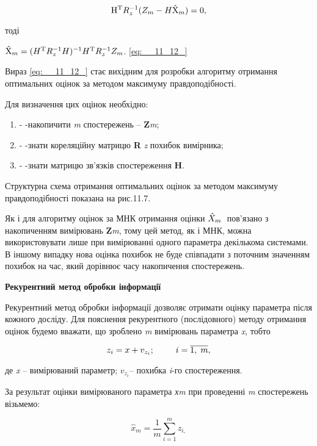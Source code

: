 \[{\rm H} ^{{\rm T}} R_{z}^{-1} (Z_{m} -H\hat{{\rm X} }_{m} )=0,\] 

тоді        

   $\hat{{\rm X} }_{m} =(H^{{\rm T}} R_{z}^{-1} H)^{-1} H^{{\rm T}} R_{z}^{-1} Z_{m} $.                      
\eqref{eq:__11_12_}

Вираз \eqref{eq:__11_12_} стає вихідним для розробки алгоритму отримання оптимальних 
оцінок  за методом максимуму правдоподібності.

Для визначення цих оцінок необхідно:

\begin{enumerate}
\item - -накопичити \textit{m}  спостережень -- \textbf{Z}\textit{m};

\item - -знати кореляційну матрицю \textbf{R }\textit{z} похибок вимірника;

\item - -знати матрицю зв'язків спостереження \textbf{H}.
\end{enumerate}

Структурна схема отримання оптимальних оцінок за методом максимуму правдоподібності 
показана на рис.11.7.

Як і для алгоритму оцінок за МНК отримання оцінки $\hat{X}_{m{\rm \; }} $  пов'язано 
з накопиченням вимірювань \textbf{Z}\textit{m}, тому цей метод, як і МНК, можна використовувати 
лише при вимірюванні одного параметра декількома системами. В іншому випадку нова 
оцінка похибок  не буде співпадати з поточним значенням похибок на час, який дорівнює 
часу накопичення спостережень.

$ $\textbf{Рекурентний метод обробки інформації}

 Рекурентний метод обробки інформації\textbf{ }дозволяє отримати оцінку параметра 
після кожного досліду. Для пояснення рекурентного (послідовного) методу отримання 
оцінок будемо вважати, що зроблено \textit{m} вимірювань параметра \textit{x}, тобто

\[z_{i} 
=x+v_{z_{i} } ;{\rm \; \; \; \; \; \; \; \; \; }i=\overline{1,{\rm \; }m},\] 

де  \textit{x} -- вимірюваний параметр; $v_{z_{i} } $-- похибка \textit{i}-го спостереження.

За 
результат оцінки вимірюваного параметра \textit{хm }при проведенні \textit{m} спостережень 
візьмемо:

\[\hat{x}_{m} =\frac{1}{m} \sum _{i=1}^{m}z_{i,}  \] 

